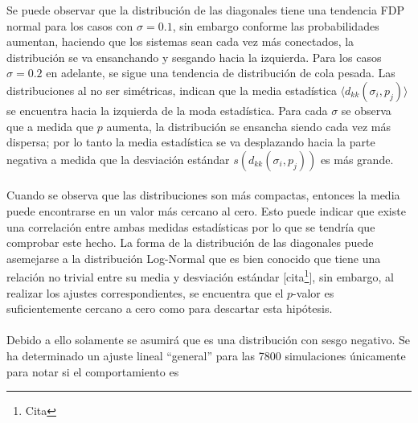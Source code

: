 Se puede observar que la distribución de las diagonales tiene una tendencia FDP normal para los casos con $\sigma=0.1$, sin embargo conforme las probabilidades aumentan, haciendo que los sistemas sean cada vez más conectados, la distribución se va ensanchando y sesgando hacia la izquierda. Para los casos $\sigma=0.2$ en adelante, se sigue una tendencia de distribución de cola pesada. Las distribuciones al no ser simétricas, indican que la media estadística $\langle d_{kk}(\sigma_i,p_j)\rangle$ se encuentra hacia la izquierda de la moda estadística. Para cada $\sigma$ se observa que a medida que $p$ aumenta, la distribución se ensancha siendo cada vez más dispersa; por lo tanto la media estadística se va desplazando hacia la parte negativa a medida que la desviación estándar $s(d_{kk}(\sigma_i,p_j))$ es más grande.
\\
\\
Cuando se observa que las distribuciones son más compactas, entonces la media puede encontrarse en un valor más cercano al cero. Esto puede indicar que existe una correlación entre ambas medidas estadísticas por lo que se tendría que comprobar este hecho. La forma de la distribución de las diagonales puede asemejarse a la distribución Log-Normal que es bien conocido que tiene una relación no trivial entre su media y desviación estándar [cita\footnote{Cita}], sin embargo, al realizar los ajustes correspondientes, se encuentra que el $p$-valor es suficientemente cercano a cero como para descartar esta hipótesis. \\
\\
Debido a ello solamente se asumirá que es una distribución con sesgo negativo. Se ha determinado un ajuste lineal ``general'' para las 7800 simulaciones únicamente para notar si el comportamiento es 
